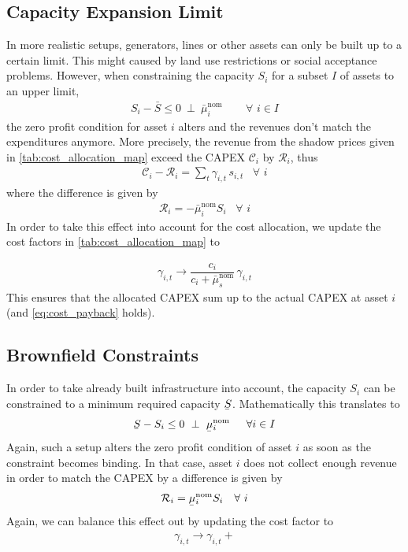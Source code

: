 \documentclass[11pt,twocolumn]{article}
\newcommand{\ubar}[1]{\underaccent{\bar}{#1}}
\newcommand{\hpad}{\hspace{15pt}}
\newcommand{\resultsin}[1]{\hspace{6pt} \bot  \hspace{6pt} #1}
\newcommand{\Forall}[1]{\hspace{10pt} \forall \,\, #1 }
\newcommand{\state}{s_{i,t}}
\newcommand{\capacity}{S_{i}}
\newcommand{\costfactor}{\gamma_{i,t}}
\newcommand{\capacityupper}{\bar{S}}
\newcommand{\capacitylower}{\ubar{S}}
\newcommand{\muuppernom}{\bar{\mu}^\text{nom}_{i}}
\newcommand{\mulowernom}{\ubar{\mu}^\text{nom}_{i}}
\newcommand{\muuppergenerationnom}{\bar{\mu}^\text{nom}_{s}}
\newcommand{\cost}{\mathcal{C}}
\newcommand{\remainingcost}{\mathcal{R}}
\begin{document}
\subsection{Capacity Expansion Limit}

In more realistic setups, generators, lines or other assets can only be built up to a certain limit. This might caused by land use restrictions or social acceptance problems. %
However, when constraining the capacity $\capacity$  for a subset $I$ of assets to an upper limit,
\begin{align}
    \capacity - \capacityupper \le 0 \resultsin{\muuppernom} \hpad \Forall{i \in I}
\label{eq:capacityexpansionmaximum}
\end{align}
the zero profit condition for asset $i$ alters and the revenues don't match the expenditures anymore. More precisely, the revenue from the shadow prices given in \cref{tab:cost_allocation_map} exceed the CAPEX $\cost_i$ by $\remainingcost_i$, thus  
\begin{align}
 \cost_i - \remainingcost_i =  \sum_t \costfactor \, \state \Forall{i}
 \label{eq:capex_generation_duality_bf2}
\end{align}
where the difference is given by 
\begin{align}
    \remainingcost_i = - \muuppernom \capacity
    \Forall{i}
\end{align}
In order to take this effect into account for the cost allocation, we update the cost factors in \cref{tab:cost_allocation_map} to  

\begin{align}
    \costfactor \rightarrow \dfrac{c_i}{c_i + \muuppergenerationnom}\, \costfactor
\end{align}
This ensures that the allocated CAPEX sum up to the actual CAPEX at asset $i$ (and \cref{eq:cost_payback} holds).

\subsection{Brownfield Constraints}

In order to take already built infrastructure into account, the capacity $\capacity$ can be constrained to a minimum required capacity $\capacitylower$. Mathematically this translates to 
\begin{align}
    \capacitylower - \capacity  \le 0 \resultsin{\mulowernom} \hpad \forall{i \in I}
\label{eq:capacityexpansionminimum}
\end{align}
Again, such a setup alters the zero profit condition of asset $i$ as soon as the constraint becomes binding. 
In that case, asset $i$ does not collect enough revenue in order to match the CAPEX by a difference is given by 
\begin{align}
    \remainingcost_i = \mulowernom \capacity
    \Forall{i}
\end{align}
Again, we can balance this effect out by updating the cost factor to 
\begin{align}
    \costfactor \rightarrow \costfactor + 
\end{align}
\end{document}
